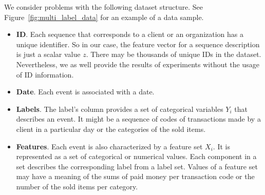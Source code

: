 \documentclass[runningheads]{llncs}
\begin{document}
We consider problems with the following dataset structure. See Figure~\ref{fig:multi_label_data} for an example of a data sample.
\begin{itemize}
    \item \textbf{ID}. Each sequence that corresponds to a client or an organization has a unique identifier. So in our case, the feature vector for a sequence description is just a scalar value $z$. There may be thousands of unique IDs in the dataset. Nevertheless, we as well provide the results of experiments without the usage of ID information.
    \item \textbf{Date}. Each event is associated with a date. 
    \item \textbf{Labels}. The label's column provides a set of categorical variables $Y_i$ that describes an event. It might be a sequence of codes of transactions made by a client in a particular day or the categories of the sold items.
    \item \textbf{Features}. Each event is also characterized by a feature set $X_i$. It is represented as a set of categorical or numerical values. Each component in a set describes the corresponding label from a label set. Values of a feature set may have a meaning of the sums of paid money per transaction code or the number of the sold items per category.
\end{itemize}



\end{document}
